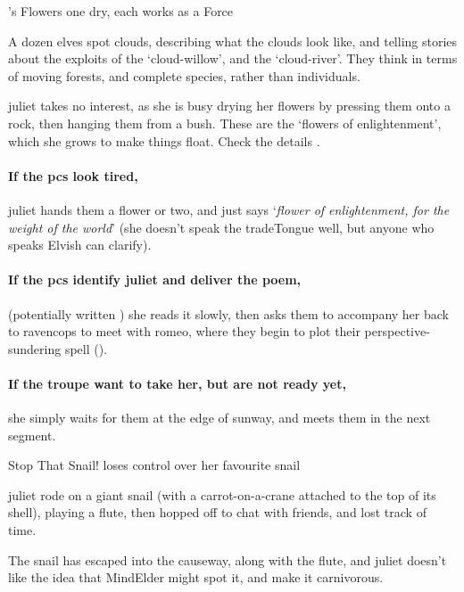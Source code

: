 {'s Flowers}%
{one dry, each works as a Force }%

A dozen elves spot clouds, describing what the clouds look like, and telling stories about the exploits of the `cloud-willow', and the `cloud-river'.
They think in terms of moving forests, and complete species, rather than individuals.

\Gls{juliet} takes no interest, as she is busy drying her flowers by pressing them onto a rock, then hanging them from a bush.
These are the `flowers of enlightenment', which she grows to make things float.
Check the details .

\juliet

\paragraph{If the \glspl{pc} look tired,}
\gls{juliet} hands them a flower or two, and just says `\textit{flower of enlightenment, for the weight of the world}' (she doesn't speak the \gls{tradeTongue} well, but anyone who speaks Elvish can clarify).

\paragraph{If the \glspl{pc} identify \gls{juliet} and deliver the poem,}
(potentially written ) she reads it slowly, then asks them to accompany her back to \gls{ravencops} to meet with \gls{romeo}, where they begin to plot their perspective-sundering spell ().

\paragraph{If the troupe want to take her, but are not ready yet,}
she simply waits for them at the edge of \gls{sunway}, and meets them in the next \gls{segment}.

{Stop That Snail!}%
{ loses control over her favourite snail}%

\Gls{juliet} rode on a giant snail (with a carrot-on-a-crane attached to the top of its shell), playing a flute, then hopped off to chat with friends, and lost track of time.

The snail has escaped into the causeway, along with the flute, and \gls{juliet} doesn't like the idea that \gls{MindElder} might spot it, and make it carnivorous.

